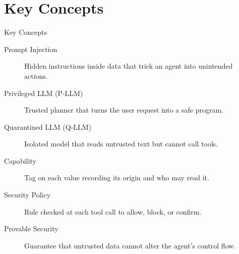 \documentclass[10pt]{beamer}
\begin{document}
\section{Key Concepts}
\begin{frame}[allowframebreaks]{Key Concepts}
  \begin{description}
    \item[Prompt Injection] Hidden instructions inside data that trick an agent into unintended actions.
    \item[Privileged LLM (P-LLM)] Trusted planner that turns the user request into a safe program.
    \item[Quarantined LLM (Q-LLM)] Isolated model that reads untrusted text but cannot call tools.
    \item[Capability] Tag on each value recording its origin and who may read it.
    \item[Security Policy] Rule checked at each tool call to allow, block, or confirm.
    \item[Provable Security] Guarantee that untrusted data cannot alter the agent's control flow.
  \end{description}
\end{frame}
\end{document}
